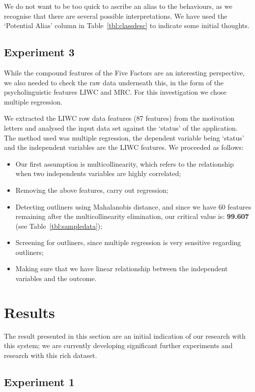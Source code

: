 \documentclass[letterpaper]{article}
\begin{document}
We do not want to be too quick to ascribe an alias to the behaviours,
as we recognise that there are several possible interpretations. We
have used the `Potential Alias' column in Table~\ref{tbl:classdesc} to
indicate some initial thoughts.


\subsection{Experiment 3}

While the compound features of the Five Factors are an interesting
perspective, we also needed to check the raw data underneath this, in
the form of the psycholinguistic features LIWC and MRC. For this
investigation we chose multiple regression.

We extracted the LIWC row data features (87 features) from the
motivation letters and analysed the input data set against the
`status' of the application. The method used was multiple regression,
the dependent variable being `status' and the independent variables
are the LIWC features. We proceeded as follows:

\begin{itemize}
\item Our first assumption is multicollinearity, which refers to the
  relationship when two independents variables are highly correlated;
\item Removing the above features, carry out regression;
\item Detecting outliners using Mahalanobis distance, and since we
  have 60 features remaining after the multicollinearity elimination,
  our critical value is: {\textbf{99.607}} (see Table~\ref{tbl:sampledata});
\item Screening for outliners, since multiple regression is very
  sensitive regarding outliners;
\item Making sure that we have linear relationship between the
  independent variables and the outcome.
\end{itemize}


\section{Results}

The result presented in this section are an initial indication of our
research with this system; we are currently developing
significant further experiments and research with this rich dataset.

\subsection{Experiment 1}
\end{document}
